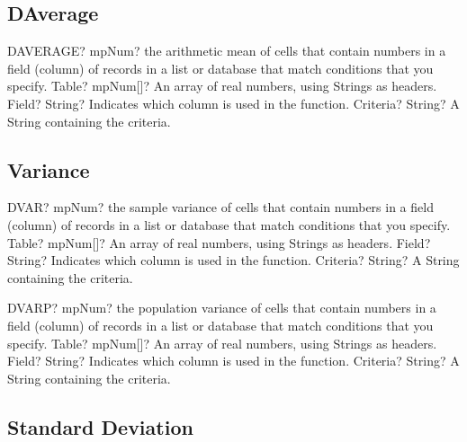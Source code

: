 \subsection{DAverage}

\begin{mpFunctionsExtract}
	\mpWorksheetFunctionThreeNotImplemented
	{DAVERAGE? mpNum? the arithmetic mean of cells that contain numbers in a field (column) of records in a list or database that match conditions that you specify.}
	{Table? mpNum[]? An array of real numbers, using Strings as headers.}
	{Field? String? Indicates which column is used in the function.}
	{Criteria? String? A String containing the criteria.}
\end{mpFunctionsExtract}





\subsection{Variance}

\begin{mpFunctionsExtract}
	\mpWorksheetFunctionThreeNotImplemented
	{DVAR? mpNum? the sample variance of cells that contain numbers in a field (column) of records in a list or database that match conditions that you specify.}
	{Table? mpNum[]? An array of real numbers, using Strings as headers.}
	{Field? String? Indicates which column is used in the function.}
	{Criteria? String? A String containing the criteria.}
\end{mpFunctionsExtract}

\vspace{0.6cm}
\begin{mpFunctionsExtract}
	\mpWorksheetFunctionThreeNotImplemented
	{DVARP? mpNum? the population variance of cells that contain numbers in a field (column) of records in a list or database that match conditions that you specify.}
	{Table? mpNum[]? An array of real numbers, using Strings as headers.}
	{Field? String? Indicates which column is used in the function.}
	{Criteria? String? A String containing the criteria.}
\end{mpFunctionsExtract}





\subsection{Standard Deviation}

